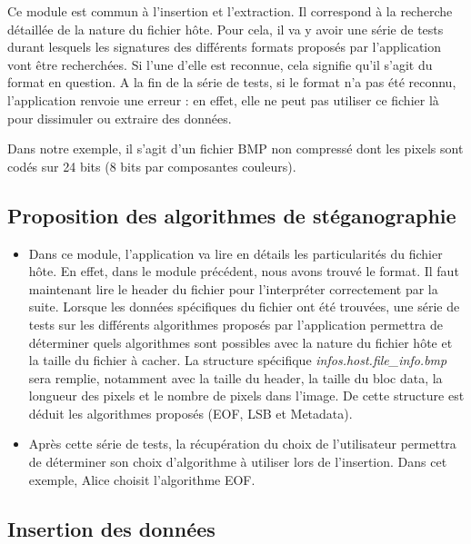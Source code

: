 \documentclass[11pt]{article}
\begin{document}
Ce module est commun à l'insertion et l'extraction. Il correspond à la 
recherche détaillée de la nature du fichier hôte. 
Pour cela, il va y avoir une série de tests durant lesquels les
signatures des différents formats proposés par l'application vont être recherchées. 
Si l'une d'elle est reconnue, cela signifie qu'il s'agit du format en question. 
A la fin de la série de tests, si le format n'a pas été reconnu, 
l'application renvoie une erreur : en effet, elle ne peut pas utiliser ce 
fichier là pour dissimuler ou extraire des données. 

Dans notre exemple, il s'agit d'un fichier BMP non compressé dont les 
pixels sont codés sur 24 bits (8 bits par composantes couleurs). 

\subsection{Proposition des algorithmes de stéganographie}

\begin{itemize}
\item Dans ce module, l'application va lire en détails les particularités du fichier 
hôte. En effet, dans le module précédent, nous avons trouvé le format. Il 
faut maintenant lire le header du fichier pour l'interpréter correctement 
par la suite. Lorsque les données spécifiques du fichier ont été trouvées, 
une série de tests sur les différents algorithmes proposés par l'application
permettra de déterminer quels algorithmes sont possibles avec la nature 
du fichier hôte et la taille du fichier à cacher. 
\newline 
La structure spécifique \textit{infos.host.file\_info.bmp} sera remplie, 
notamment avec la taille du header, la taille du bloc data, la longueur 
des pixels et le nombre de pixels dans l'image. De cette structure
est déduit les algorithmes proposés (EOF, LSB et Metadata). 
\newline
\item Après cette série de tests, la récupération du choix de l'utilisateur 
permettra de déterminer son choix d'algorithme à utiliser lors de l'insertion. 
\newline 
Dans cet exemple, Alice choisit l'algorithme EOF. 
\end{itemize}

\subsection{Insertion des données}
\end{document}
